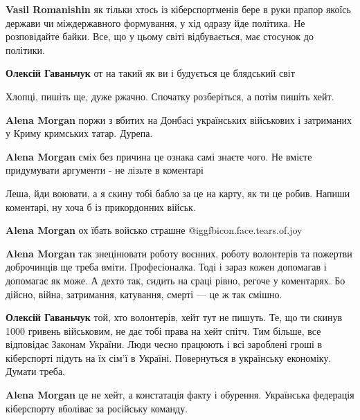 \begin{itemize}
\begin{itemize}
\begin{itemize} %
\textbf{Vasil Romanishin} як тільки хтось із кіберспортменів бере в руки прапор якоїсь держави чи міждержавного формування, у хід одразу йде політика. Не розповідайте байки. Все, що у цьому світі відбувається, має стосунок до політики.

\textbf{Олексій Гаваньчук} от на такий як ви і будується це блядський світ
\end{itemize} %

Хлопці, пишіть ще, дуже ржачно. Спочатку розберіться, а потім пишіть хейт.

\begin{itemize} %
\textbf{Alena Morgan} поржи з вбитих на Донбасі українських військових і затриманих у Криму кримських татар. Дурепа.

\textbf{Alena Morgan} сміх без причина це ознака самі знаєте чого. Не вмієте придумувати аргументи - не лізьте в коментарі
\end{itemize} %

\end{itemize} %

Леша, йди воювати, а я скину тобі бабло за це на карту, як ти це робив. Напиши коментарі, ну хоча б із прикордонних військ.

\begin{itemize} %
\textbf{Alena Morgan} ох їбать войсько страшне @igg{fbicon.face.tears.of.joy} 

\textbf{Alena Morgan} так знецінювати роботу воєнних, роботу волонтерів та пожертви доброчинців ще треба вміти. Професіоналка. Тоді і зараз кожен допомагав і допомагає як може. А дехто так, сидить на сраці рівно, регоче у коментарях. Бо дійсно, війна, затримання, катування, смерті — це ж так смішно.

\textbf{Олексій Гаваньчук} той, хто волонтерів, хейт тут не пишуть. Те, що ти скинув 1000 гривень військовим, не дає тобі права на хейт спітч. Тим більше, все відповідає Законам України. Люди чесно працюють і всі зароблені гроші в кіберспорті підуть на їх сім'ї в Україні. Повернуться в українську економіку. Думати треба.

\textbf{Alena Morgan} це не хейт, а констатація факту і обурення. Українська федерація кіберспорту вболіває за російську команду.
\end{itemize} %


\end{itemize}
